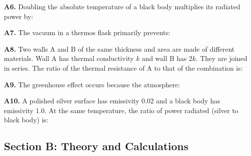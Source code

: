\begin{exercisebox}[16]
\vspace{0.4cm}

\textbf{A6.} Doubling the absolute temperature of
a black body multiplies its radiated power by:


\vspace{0.4cm}

\textbf{A7.} The vacuum in a thermos flask
primarily prevents:


\vspace{0.4cm}

\textbf{A8.} Two walls A and B of the same
thickness and area are made of different materials.
Wall A has thermal conductivity $k$ and wall B has
$2k$. They are joined in series. The ratio of the
thermal resistance of A to that of the combination is:


\vspace{0.4cm}

\textbf{A9.} The greenhouse effect occurs because
the atmosphere:


\vspace{0.4cm}

\textbf{A10.} A polished silver surface has
emissivity $0.02$ and a black body has emissivity
$1.0$. At the same temperature, the ratio of power
radiated (silver to black body) is:


\vspace{0.6cm}

\subsection*{Section B: Theory and Calculations}


\end{exercisebox}
